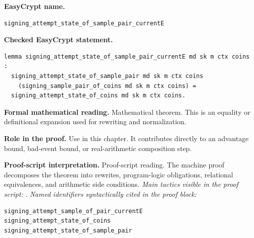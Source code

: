 \begin{formaltheorem}
\noindent\textbf{EasyCrypt name.}
\begin{lstlisting}[language=EasyCrypt,basicstyle=\ttfamily\scriptsize]
signing_attempt_state_of_sample_pair_currentE
\end{lstlisting}
\noindent\textbf{Checked EasyCrypt statement.}
\begin{lstlisting}[language=EasyCrypt,basicstyle=\ttfamily\scriptsize]
lemma signing_attempt_state_of_sample_pair_currentE md sk m ctx coins :
  signing_attempt_state_of_sample_pair md sk m ctx coins
    (signing_sample_pair_of_coins md sk m ctx coins) =
  signing_attempt_state_of_coins md sk m ctx coins.
\end{lstlisting}
\noindent\textbf{Formal mathematical reading.}
Mathematical theorem. This is an equality or definitional expansion used for rewriting and normalization.

\noindent\textbf{Role in the proof.}
Use in this chapter. It contributes directly to an advantage bound, bad-event bound, or real-arithmetic composition step.

\noindent\textbf{Proof-script interpretation.}
Proof-script reading. The machine proof decomposes the theorem into rewrites, program-logic obligations, relational equivalences, and arithmetic side conditions.
\emph{Main tactics visible in the proof script:} .
\emph{Named identifiers syntactically cited in the proof block:}
\begin{lstlisting}[language=EasyCrypt,basicstyle=\ttfamily\scriptsize]
signing_attempt_sample_of_pair_currentE
signing_attempt_state_of_coins
signing_attempt_state_of_sample_pair
\end{lstlisting}

\end{formaltheorem}

